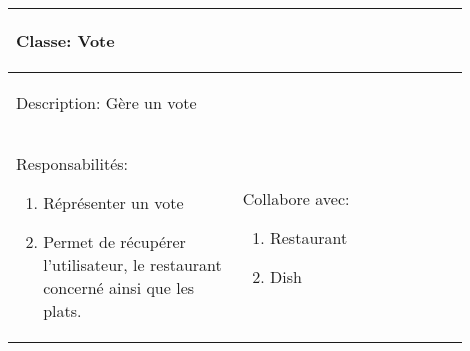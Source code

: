 \documentclass[10pt,a4paper]{article}
\begin{document}
\begin{tabular}{|p{0.45\linewidth}|p{0.45\linewidth}|}
  \hline
  \multicolumn{2}{|l|}{\begin{large}
  	Classe: Vote
  \end{large}}\\
  \hline
  \multicolumn{2}{|l|}{\begin{normalsize}
  	Description: Gère un vote
  \end{normalsize}}\\[0.05\linewidth]
  \hline
  \begin{normalsize}
  	Responsabilités:
  	\begin{enumerate}
  		\item Réprésenter un vote
  		\item Permet de récupérer l'utilisateur, le restaurant concerné ainsi que les plats.
  	\end{enumerate}
  \end{normalsize} & 
  \begin{normalsize}{
  	Collabore avec:
  	\begin{enumerate}
  		\item Restaurant
  		\item Dish
  	\end{enumerate}
  }\end{normalsize}\\[0.6\linewidth]
  \hline
\end{tabular}
\end{document}

